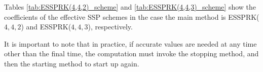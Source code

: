 
Tables \ref{tab:ESSPRK(4,4,2)_scheme} and \ref{tab:ESSPRK(4,4,3)_scheme} 
show the coefficients of the effective SSP schemes in the case the main 
method is ESSPRK($4,4,2$) and ESSPRK($4,4,3$), respectively. 

It is important to note that in practice, if accurate values are needed at 
any time other than the final time, the computation must invoke the 
stopping method, and then the starting method to start up again.

